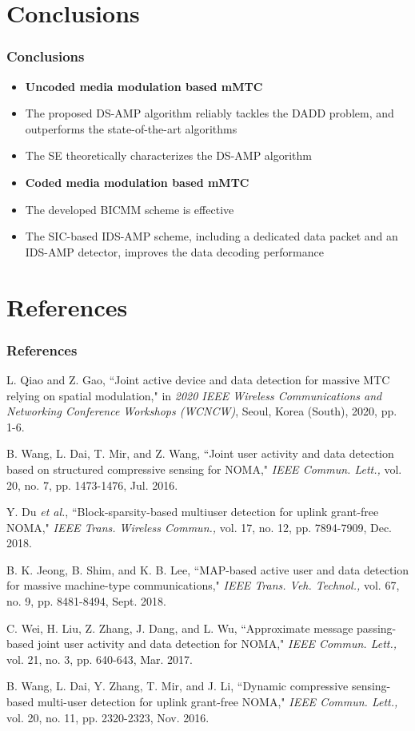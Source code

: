 \documentclass[9pt]{beamer}
\begin{document}
\section{Conclusions}
\begin{frame}
\frametitle{Conclusions}
\begin{itemize}
\item
{\bf Uncoded media modulation based mMTC}
\item
The proposed DS-AMP algorithm reliably tackles the DADD problem, and outperforms the state-of-the-art algorithms
\item
The SE theoretically characterizes the DS-AMP algorithm
\item
{\bf Coded media modulation based mMTC}
\item
The developed BICMM scheme is effective 
\item
The SIC-based IDS-AMP scheme, including a dedicated data packet and an IDS-AMP detector, improves the data decoding performance
\end{itemize}
\end{frame}

\section{References}
\begin{frame}
\frametitle{References}
\begin{thebibliography}{15}
L. Qiao and Z. Gao, ``Joint active device and data detection for massive MTC relying on spatial modulation," in {\em 2020 IEEE Wireless Communications and Networking Conference Workshops (WCNCW)}, Seoul, Korea (South), 2020, pp. 1-6.

B. Wang, L. Dai, T. Mir, and Z. Wang, ``Joint user activity and data detection based on structured compressive sensing for NOMA," {\em IEEE Commun. Lett.,} vol. 20, no. 7, pp. 1473-1476, Jul. 2016.

Y. Du \textit{et al.}, ``Block-sparsity-based multiuser detection for uplink grant-free NOMA," {\em IEEE Trans. Wireless Commun.,} vol. 17, no. 12, pp. 7894-7909, Dec. 2018.

B. K. Jeong, B. Shim, and K. B. Lee, ``MAP-based active user and data detection for massive machine-type communications," {\em IEEE
Trans. Veh. Technol.,} vol. 67, no. 9, pp. 8481-8494, Sept. 2018.

C. Wei, H. Liu, Z. Zhang, J. Dang, and L. Wu, ``Approximate message passing-based joint user activity and data detection for NOMA," {\em IEEE Commun. Lett.,} vol. 21, no. 3, pp. 640-643, Mar. 2017.

B. Wang, L. Dai, Y. Zhang, T. Mir, and J. Li, ``Dynamic compressive sensing-based multi-user detection for uplink grant-free NOMA," {\em IEEE Commun. Lett.,} vol. 20, no. 11, pp. 2320-2323, Nov. 2016.
\end{thebibliography}
\end{frame}
\end{document}
